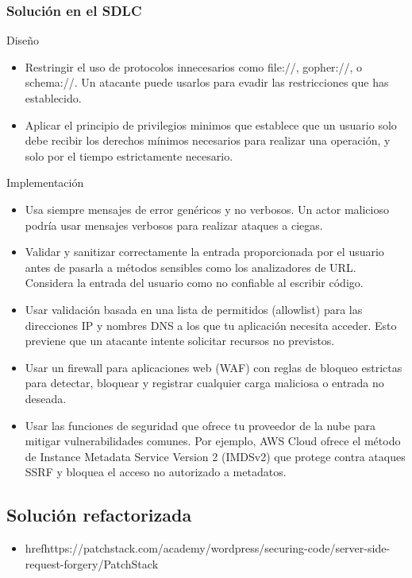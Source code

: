 \subsubsection{Solución en el SDLC}
Diseño
\begin{itemize}
    \item Restringir el uso de protocolos innecesarios como file://, gopher://, o schema://. Un atacante puede usarlos para evadir las restricciones que has establecido.
    \item Aplicar el principio de privilegios minimos que establece que un usuario solo debe recibir los derechos mínimos necesarios para realizar una operación, y solo por el tiempo estrictamente necesario.

\end{itemize}
Implementación
\begin{itemize}
    \item Usa siempre mensajes de error genéricos y no verbosos. Un actor malicioso podría usar mensajes verbosos para realizar ataques a ciegas.
    \item Validar y sanitizar correctamente la entrada proporcionada por el usuario antes de pasarla a métodos sensibles como los analizadores de URL. Considera la entrada del usuario como no confiable al escribir código.
    \item Usar validación basada en una lista de permitidos (allowlist) para las direcciones IP y nombres DNS a los que tu aplicación necesita acceder. Esto previene que un atacante intente solicitar recursos no previstos.
    \item Usar un firewall para aplicaciones web (WAF) con reglas de bloqueo estrictas para detectar, bloquear y registrar cualquier carga maliciosa o entrada no deseada.
    \item Usar las funciones de seguridad que ofrece tu proveedor de la nube para mitigar vulnerabilidades comunes. Por ejemplo, AWS Cloud ofrece el método de Instance Metadata Service Version 2 (IMDSv2) que protege contra ataques SSRF y bloquea el acceso no autorizado a metadatos.
    
\end{itemize}
\subsection{Solución refactorizada}

\begin{itemize}
    \item href{https://patchstack.com/academy/wordpress/securing-code/server-side-request-forgery/}{PatchStack}
\end{itemize}

